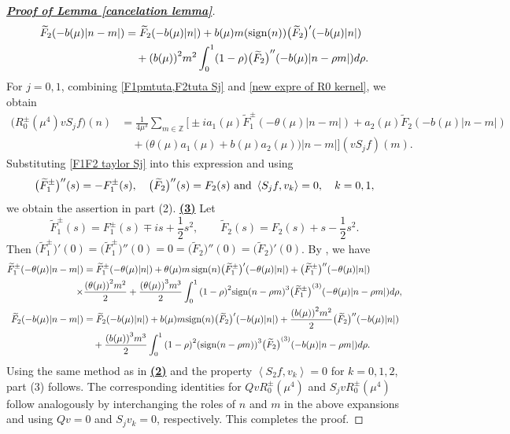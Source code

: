 \documentclass[reqno, 11pt]{amsart}
\newcommand\Z{\mathbb{Z}}
\numberwithin{equation}{section}
\begin{document}
\begin{proof}[{\bf{\underline{Proof of Lemma \ref{cancelation lemma}}}}]
\begin{align}
\begin{split}
\widetilde{F}_2(-b(\mu)|n-m|)&=\widetilde{F}_2(-b(\mu)|n|)+b(\mu)m({\rm sign}(n))\big(\widetilde{F}_2\big)'(-b(\mu)|n|)\\
&\quad+{(b(\mu))}^2m^2\int_{0}^{1}(1-\rho){\big(\widetilde{F}_2\big)}''(-b(\mu)|n-\rho m|)d\rho.
\end{split}
\end{align}
For $j=0,1$, combining \eqref{F1pmtuta,F2tuta Sj} and \eqref{new expre of R0 kernel}, we obtain 
\begin{align*}
\big(R^{\pm}_0(\mu^4)vS_jf\big)(n)
&=\frac{1}{4\mu^3}\sum\limits_{m\in\Z}\Big[\pm ia_1(\mu)\widetilde{F}^{\pm}_1(-\theta(\mu)|n-m|)+a_2(\mu)\widetilde{F}_2(-b(\mu)|n-m|)\\
&\quad+\big(\theta(\mu)a_1(\mu)+b(\mu)a_2(\mu)\big)|n-m|\Big](vS_jf)(m).
\end{align*}
Substituting \eqref{F1F2 taylor Sj} into this expression and using $$\big(\widetilde{F}^{\pm}_1\big)''(s)=-{F}^{\pm}_1(s),\quad   \big(\widetilde{F}_2\big)''(s)=F_2(s)\ {\rm and}\  \left<S_jf,v_k\right>=0,\quad k=0,1,$$
we obtain the assertion in part (2).
\vskip0.1cm
{\bf{\underline{(3)}}} Let
$$\widetilde{F}^{\pm}_1(s)=F^{\pm}_1(s)\mp is+\frac{1}{2}s^2,\qquad \widetilde{F}_2(s)=F_2(s)+s-\frac{1}{2}s^2.$$
Then $\big(\widetilde{F}^{\pm}_1\big)'(0)=\big(\widetilde{F}^{\pm}_1\big)''(0)=0=\big(\widetilde{F}_2\big)''(0)=\big(\widetilde{F}_2\big)'(0)$. By \cite[Lemma 2.5~(iii)]{SWY22}, we have
\begin{align*}
\widetilde{F}^{\pm}_1(-\theta(\mu)|n-m|)&=\widetilde{F}^{\pm}_1(-\theta(\mu)|n|)+\theta(\mu)m\operatorname{sign}(n)\big(\widetilde{F}^{\pm}_1\big)'(-\theta(\mu)|n|)+\big(\widetilde{F}^{\pm}_1\big)''(-\theta(\mu)|n|)\notag\\
\times&\frac{{(\theta(\mu))}^2m^2}{2}+\frac{{(\theta(\mu))}^3m^3}{2}\int_{0}^{1}{(1-\rho)}^2{{\rm sign}(n-\rho m)}^3{\big(\widetilde{F}^{\pm}_1\big)}^{(3)}(-\theta(\mu)|n-\rho m|)d\rho,\notag\\
\widetilde{F}_2(-b(\mu)|n-m|)&=\widetilde{F}_2(-b(\mu)|n|)+b(\mu)m{\rm sign}(n)\big(\widetilde{F}_2\big)'(-b(\mu)|n|)+\frac{{(b(\mu))}^2m^2} {2}\big(\widetilde{F}_2\big)''(-b(\mu)|n|)\notag\\
&\quad+\frac{{(b(\mu))}^3m^3}{2}\int_{0}^{1}{(1-\rho)}^2{({\rm sign}(n-\rho m))}^3{\big(\widetilde{F}_2\big)}^{(3)}(-b(\mu)|n-\rho m|)d\rho.
\end{align*}
Using the same method as in {\bf{\underline{(2)}}} and the property $\left<S_2f,v_k\right>=0$ for $k=0,1,2$, part (3) follows.
\vskip0.1cm
The corresponding identities for $QvR_0^\pm(\mu^4)$ and $S_jvR_0^\pm(\mu^4)$ follow analogously by interchanging the roles of $n$ and $m$ in the above expansions and using $Qv=0$ and $S_jv_k=0$, respectively. This completes the proof.
\end{proof}
\end{document}
